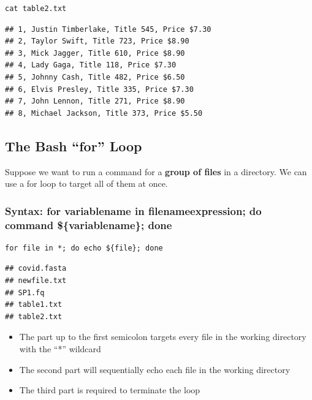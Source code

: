 \documentclass[
]{book}
\providecommand{\tightlist}{%
  \setlength{\itemsep}{0pt}\setlength{\parskip}{0pt}}
\begin{document}
\begin{verbatim}
cat table2.txt
\end{verbatim}

\begin{verbatim}
## 1, Justin Timberlake, Title 545, Price $7.30
## 2, Taylor Swift, Title 723, Price $8.90
## 3, Mick Jagger, Title 610, Price $8.90
## 4, Lady Gaga, Title 118, Price $7.30
## 5, Johnny Cash, Title 482, Price $6.50
## 6, Elvis Presley, Title 335, Price $7.30
## 7, John Lennon, Title 271, Price $8.90
## 8, Michael Jackson, Title 373, Price $5.50
\end{verbatim}

\hypertarget{the-bash-for-loop}{%
\subsection{The Bash ``for'' Loop}\label{the-bash-for-loop}}

Suppose we want to run a command for a \textbf{group of files} in a directory. We can use a for loop to target all of them at once.

\hypertarget{syntax-for-variablename-in-filenameexpression-do-command-variablename-done}{%
\subsubsection*{Syntax: for variablename in filenameexpression; do command \$\{variablename\}; done}\label{syntax-for-variablename-in-filenameexpression-do-command-variablename-done}}

\begin{verbatim}
for file in *; do echo ${file}; done
\end{verbatim}

\begin{verbatim}
## covid.fasta
## newfile.txt
## SP1.fq
## table1.txt
## table2.txt
\end{verbatim}

\begin{itemize}
\tightlist
\item
  The part up to the first semicolon targets every file in the working directory with the ``*'' wildcard
\item
  The second part will sequentially echo each file in the working directory
\item
  The third part is required to terminate the loop
\end{itemize}
\end{document}
